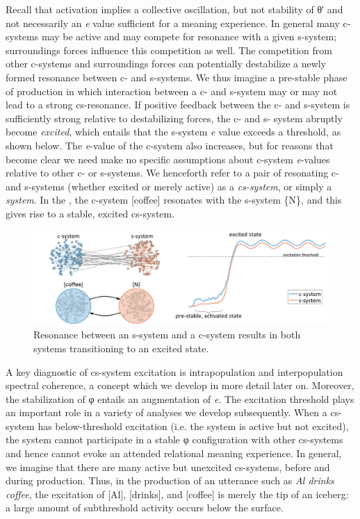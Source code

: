   Recall that activation implies a collective oscillation, but not stability of θ′ and not necessarily an \textit{e} value sufficient for a meaning experience. In general many c-systems may be active and may compete for resonance with a given s-system; surroundings forces influence this competition as well. The competition from other c-systems and surroundings forces can potentially destabilize a newly formed resonance between c- and s-systems. We thus imagine a pre-stable phase of production in which interaction between a c- and s-system may or may not lead to a strong cs-resonance. If positive feedback between the c- and s-system is sufficiently strong relative to destabilizing forces, the c- and s- system abruptly become \textit{excited}, which entails that the s-system \textit{e} value exceeds a threshold, as shown below. The \textit{e}{}-value of the c-system also increases, but for reasons that become clear we need make no specific assumptions about c-system \textit{e}{}-values relative to other c- or s-systems. We henceforth refer to a pair of resonating c- and s-systems (whether excited or merely active) as a \textit{cs-system}, or simply a \textit{system}. In the {\figurebelow}, the c-system [coffee] resonates with the s-system \{N\}, and this gives rise to a stable, excited cs-system.

  
\begin{figure}
\includegraphics[width=\textwidth]{figures/Tilsen-img17.png}
\caption{Resonance between an s-system and a c-system results in both systems transitioning to an excited state.}
\label{fig:2:10}
\end{figure}
 

  A key diagnostic of cs-system excitation is intrapopulation and interpopulation spectral coherence, a concept which we develop in more detail later on. Moreover, the stabilization of φ entails an augmentation of \textit{e}. The excitation threshold plays an important role in a variety of analyses we develop subsequently. When a cs-system has below-threshold excitation (i.e. the system is active but not excited), the system cannot participate in a stable φ configuration with other cs-systems and hence cannot evoke an attended relational meaning experience. In general, we imagine that there are many active but unexcited cs-systems, before and during production. Thus, in the production of an utterance such as \textit{Al drinks coffee}, the excitation of [Al], [drinks], and [coffee] is merely the tip of an iceberg: a large amount of subthreshold activity occurs below the surface.

